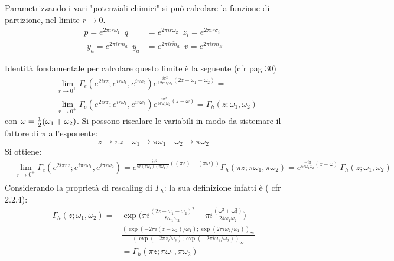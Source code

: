 \documentclass[a4paper,12pt]{article}
\begin{document}
Parametrizzando i vari "potenziali chimici" si può calcolare la funzione di partizione, nel limite $ r \rightarrow 0$.\\
$$
\begin{aligned}
p = e^{ 2 \pi i r  \omega_1 } \, \, \,  q &= e^{ 2 \pi i r \omega_2 } \,  \, \, z_i = e^{ 2 \pi i r \sigma_i } \\ 
\, \, y_a = e^{ 2 \pi i r m_a } \, \,  \, 
y_a &= e^{ 2 \pi i r  {\tilde m_a} } \, \, \,  v = e^{ 2 \pi i r m_B}
\label{fugacities_redefined}
\end{aligned}
$$

Identità fondamentale per calcolare questo limite è la seguente (cfr \citep{vanDeBult:2007} pag 30)
\begin{align*}
&\lim_{r \rightarrow 0^+} \Gamma_e (e^{ 2 i r z}; e^{ i  r \omega_1} , e^{i r  \omega_2})
 e^{\frac{ i \pi^2 }{12  r \omega_1 \omega_2 } ( 2 z - \omega_1 -\omega_2)} =\\
&\lim_{r \rightarrow 0^+} \Gamma_e (e^{ 2 i r z}; e^{ i  r \omega_1} , e^{i r  \omega_2}) 
 e^{\frac{ i \pi^2 }{6 r \omega_1 \omega_2 } (  z - \omega )} = \Gamma_h(z;\omega_1 , \omega_2)
\end{align*}
con $ \omega = {1 \over 2 } ( \omega_1 + \omega_2)$.
Si possono riscalare le variabili in modo da sistemare il fattore di $\pi$ all'esponente:
$$
 z \rightarrow \pi z \quad  \omega_1 \rightarrow  \pi \omega_1 \quad  \omega_2 \rightarrow  \pi \omega_2 
$$
Si ottiene:
\begin{align*}
&\lim_{r \rightarrow 0^+} \Gamma_e (e^{ 2 i \pi r z}; e^{ i \pi  r \omega_1} , e^{i \pi r  \omega_2}) =
 e^{\frac{ - i \pi^2 }{6 r  (\pi \omega_1) (\pi \omega_2) } ( (\pi z) - (\pi \omega))}\Gamma_h(\pi z; \pi \omega_1 ,\pi \omega_2) =   e^{\frac{ - i \pi }{6 r \omega_1 \omega_2 } (  z - \omega )} \, \Gamma_h ( z; \omega_1 , \omega_2 ) \\
\end{align*}
Considerando la proprietà di rescaling di $\Gamma_h$: la sua definizione infatti è ( cfr \citep{vanDeBult:2007} 2.2.4):
\begin{align*}
 \Gamma_h ( z;\omega_1, \omega_2) =& \exp \bigg( \pi i \frac{(2z-\omega_1 - \omega_2)^2}{8 \omega_1 \omega_2 } - \pi i \frac{(\omega_1^2 + \omega_2^2)}{ 24 \omega_1 \omega_2} \bigg) \\
 & \frac{ (\exp( -2 \pi i (z-\omega_2)/ \omega_1 ); \exp( 2 \pi i \omega_2 / \omega_1 ))_{\infty}}
 { (\exp( -2 \pi z / \omega_2 ); \exp( - 2 \pi i \omega_1 / \omega_2))_{\infty}}\\
 & = \Gamma_h ( \pi z; \pi \omega_1, \pi \omega_2)
\end{align*}
\end{document}
